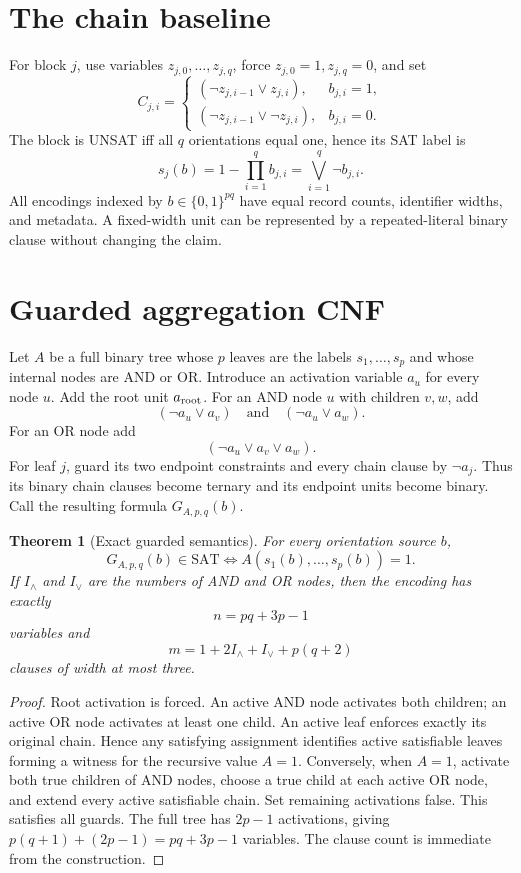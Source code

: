 \documentclass[11pt]{article}
\newtheorem{theorem}{Theorem}
\newcommand{\SAT}{\mathrm{SAT}}
\begin{document}
\section{The chain baseline}
For block $j$, use variables $z_{j,0},\ldots,z_{j,q}$, force
$z_{j,0}=1,z_{j,q}=0$, and set
\[
C_{j,i}=\begin{cases}
(\neg z_{j,i-1}\lor z_{j,i}),&b_{j,i}=1,\\
(\neg z_{j,i-1}\lor\neg z_{j,i}),&b_{j,i}=0.
\end{cases}
\]
The block is UNSAT iff all $q$ orientations equal one, hence its SAT label is
\[
s_j(b)=1-\prod_{i=1}^{q}b_{j,i}
=\bigvee_{i=1}^{q}\neg b_{j,i}.
\]
All encodings indexed by $b\in\{0,1\}^{pq}$ have equal record counts,
identifier widths, and metadata.  A fixed-width unit can be represented by a
repeated-literal binary clause without changing the claim.

\section{Guarded aggregation CNF}
Let $A$ be a full binary tree whose $p$ leaves are the labels $s_1,\ldots,s_p$
and whose internal nodes are AND or OR.  Introduce an activation variable
$a_u$ for every node $u$.  Add the root unit $a_{\rm root}$.  For an AND node
$u$ with children $v,w$, add
\[
(\neg a_u\lor a_v)\quad\text{and}\quad(\neg a_u\lor a_w).
\]
For an OR node add
\[
(\neg a_u\lor a_v\lor a_w).
\]
For leaf $j$, guard its two endpoint constraints and every chain clause by
$\neg a_j$.  Thus its binary chain clauses become ternary and its endpoint
units become binary.  Call the resulting formula $G_{A,p,q}(b)$.

\begin{theorem}[Exact guarded semantics]
For every orientation source $b$,
\[
G_{A,p,q}(b)\in\SAT
\iff A(s_1(b),\ldots,s_p(b))=1.
\]
If $I_\wedge$ and $I_\vee$ are the numbers of AND and OR nodes, then the
encoding has exactly
\[
n=pq+3p-1
\]
variables and
\[
m=1+2I_\wedge+I_\vee+p(q+2)
\]
clauses of width at most three.
\end{theorem}
\begin{proof}
Root activation is forced.  An active AND node activates both children; an
active OR node activates at least one child.  An active leaf enforces exactly
its original chain.  Hence any satisfying assignment identifies active
satisfiable leaves forming a witness for the recursive value $A=1$.
Conversely, when $A=1$, activate both true children of AND nodes, choose a true
child at each active OR node, and extend every active satisfiable chain.  Set
remaining activations false.  This satisfies all guards.  The full tree has
$2p-1$ activations, giving $p(q+1)+(2p-1)=pq+3p-1$ variables.  The clause count
is immediate from the construction.
\end{proof}
\end{document}
